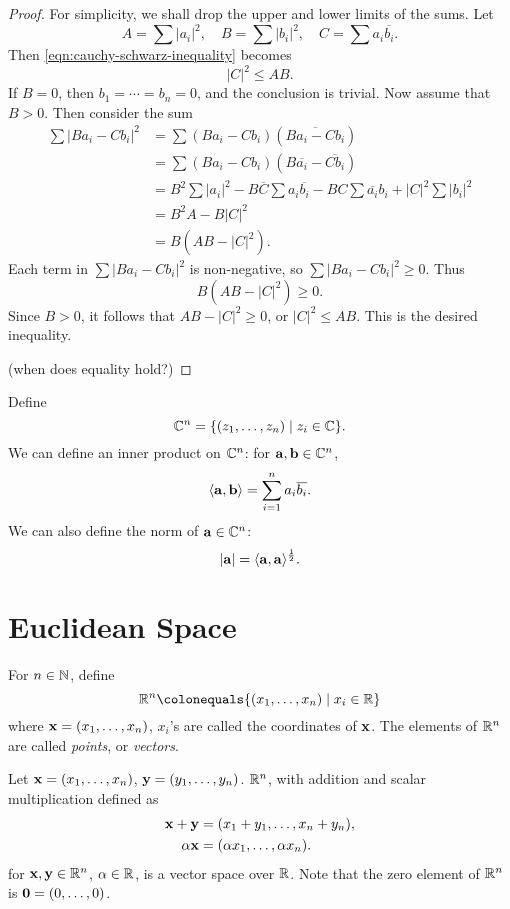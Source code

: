 \begin{proof}
For simplicity, we shall drop the upper and lower limits of the sums. 
Let
\[A=\sum|a_i|^2,\quad B=\sum|b_i|^2,\quad C=\sum a_i\overline{b_i}.\]
Then \eqref{eqn:cauchy-schwarz-inequality} becomes
\[|C|^2\le AB.\]
If $B=0$, then $b_1=\cdots=b_n=0$, and the conclusion is trivial. Now assume that $B>0$. Then consider the sum
\begin{align*}
\sum |Ba_i-Cb_i|^2
&=\sum (Ba_i-Cb_i)(\overline{Ba_i-Cb_i})\\
&=\sum (Ba_i-Cb_i)(B\overline{a_i}-\overline{Cb_i})\\
&=B^2\sum |a_i|^2-B\overline{C}\sum a_i\overline{b_i}-BC\sum \overline{a_i}b_i+|C|^2\sum |b_i|^2\\
&=B^2A-B|C|^2\\
&=B(AB-|C|^2).
\end{align*}
Each term in $\displaystyle\sum |Ba_i-Cb_i|^2$ is non-negative, so $\displaystyle\sum |Ba_i-Cb_i|^2\ge0$. Thus
\[B(AB-|C|^2)\ge0.\]
Since $B>0$, it follows that $AB-|C|^2\ge0$, or $|C|^2\le AB$. This is the desired inequality.

(when does equality hold?)
\end{proof}

\begin{mdframed}
Define
\[\mathbb C^n=\{(z_1,\dots,z_n)\mid z_i\in\mathbb C\}.\]
We can define an inner product on $\mathbb C^n$: for $\vb{a},\vb{b}\in\mathbb C^n$,
\[\langle\vb{a},\vb{b}\rangle=\sum_{i=1}^{n}a_i\overline{b_i}.\]
We can also define the norm of $\vb{a}\in\mathbb C^n$:
\[|\vb{a}|=\langle\vb{a},\vb{a}\rangle^\frac{1}{2}.\]
\end{mdframed}
\pagebreak

\section{Euclidean Space}
For $n\in\mathbb N$, define
\[\RR^n\colonequals\{(x_1,\dots,x_n)\mid x_i\in\RR\}\]
where $\vb{x}=(x_1,\dots,x_n)$, $x_i$'s are called the coordinates of $\vb{x}$. The elements of $\mathbb R^n$ are called \emph{points}, or \emph{vectors}.

\begin{lemma}
Let $\vb{x}=(x_1,\dots,x_n)$, $\vb{y}=(y_1,\dots,y_n)$. $\mathbb R^n$, with addition and scalar multiplication defined as
\begin{align*}
\vb{x}+\vb{y}&=(x_1+y_1,\dots,x_n+y_n),\\
\alpha\vb{x}&=(\alpha x_1,\dots,\alpha x_n).
\end{align*}
for $\vb{x},\vb{y}\in\mathbb R^n$, $\alpha\in\mathbb R$, is a vector space over $\mathbb R$. Note that the zero element of $\mathbb R^n$ is $\vb{0}=(0,\dots,0)$.
\end{lemma}

